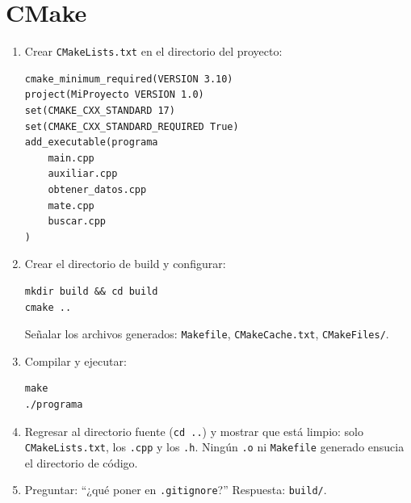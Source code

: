 \documentclass[12pt, oneside]{article}
\begin{document}
\section{CMake}

\begin{notaprofesor}
  \begin{enumerate}
    \item Crear \texttt{CMakeLists.txt} en el directorio del proyecto:
\begin{verbatim}
cmake_minimum_required(VERSION 3.10)
project(MiProyecto VERSION 1.0)
set(CMAKE_CXX_STANDARD 17)
set(CMAKE_CXX_STANDARD_REQUIRED True)
add_executable(programa
    main.cpp
    auxiliar.cpp
    obtener_datos.cpp
    mate.cpp
    buscar.cpp
)
\end{verbatim}
    \item Crear el directorio de build y configurar:
\begin{verbatim}
mkdir build && cd build
cmake ..
\end{verbatim}
          Señalar los archivos generados: \texttt{Makefile},
          \texttt{CMakeCache.txt}, \texttt{CMakeFiles/}.
    \item Compilar y ejecutar:
\begin{verbatim}
make
./programa
\end{verbatim}
    \item Regresar al directorio fuente (\texttt{cd ..}) y mostrar que
          está limpio: solo \texttt{CMakeLists.txt}, los \texttt{.cpp}
          y los \texttt{.h}.  Ningún \texttt{.o} ni \texttt{Makefile}
          generado ensucia el directorio de código.
    \item Preguntar: ``¿qué poner en \texttt{.gitignore}?''
          Respuesta: \texttt{build/}.
  \end{enumerate}
\end{notaprofesor}
\end{document}
